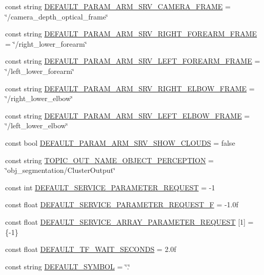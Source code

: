 \begin{DoxyCompactItemize}
\item 
const string \hyperlink{namespacesrvm_a9ae9e53a20ec9335fe07c1a42520198e}{D\-E\-F\-A\-U\-L\-T\-\_\-\-P\-A\-R\-A\-M\-\_\-\-A\-R\-M\-\_\-\-S\-R\-V\-\_\-\-C\-A\-M\-E\-R\-A\-\_\-\-F\-R\-A\-M\-E} = \char`\"{}/camera\-\_\-depth\-\_\-optical\-\_\-frame\char`\"{}
\item 
const string \hyperlink{namespacesrvm_a6e203b3aafd97558c58ada022c9cc514}{D\-E\-F\-A\-U\-L\-T\-\_\-\-P\-A\-R\-A\-M\-\_\-\-A\-R\-M\-\_\-\-S\-R\-V\-\_\-\-R\-I\-G\-H\-T\-\_\-\-F\-O\-R\-E\-A\-R\-M\-\_\-\-F\-R\-A\-M\-E} = \char`\"{}/right\-\_\-lower\-\_\-forearm\char`\"{}
\item 
const string \hyperlink{namespacesrvm_af63966bf248ec14ccf2a2ca74fa1214d}{D\-E\-F\-A\-U\-L\-T\-\_\-\-P\-A\-R\-A\-M\-\_\-\-A\-R\-M\-\_\-\-S\-R\-V\-\_\-\-L\-E\-F\-T\-\_\-\-F\-O\-R\-E\-A\-R\-M\-\_\-\-F\-R\-A\-M\-E} = \char`\"{}/left\-\_\-lower\-\_\-forearm\char`\"{}
\item 
const string \hyperlink{namespacesrvm_acb12c9f4a5661db79a05ea222c83e215}{D\-E\-F\-A\-U\-L\-T\-\_\-\-P\-A\-R\-A\-M\-\_\-\-A\-R\-M\-\_\-\-S\-R\-V\-\_\-\-R\-I\-G\-H\-T\-\_\-\-E\-L\-B\-O\-W\-\_\-\-F\-R\-A\-M\-E} = \char`\"{}/right\-\_\-lower\-\_\-elbow\char`\"{}
\item 
const string \hyperlink{namespacesrvm_ab8271bafa5b004c13196b24b77cef53a}{D\-E\-F\-A\-U\-L\-T\-\_\-\-P\-A\-R\-A\-M\-\_\-\-A\-R\-M\-\_\-\-S\-R\-V\-\_\-\-L\-E\-F\-T\-\_\-\-E\-L\-B\-O\-W\-\_\-\-F\-R\-A\-M\-E} = \char`\"{}/left\-\_\-lower\-\_\-elbow\char`\"{}
\item 
const bool \hyperlink{namespacesrvm_a7fdc748a5c9f8f7211d6e32e64f96c63}{D\-E\-F\-A\-U\-L\-T\-\_\-\-P\-A\-R\-A\-M\-\_\-\-A\-R\-M\-\_\-\-S\-R\-V\-\_\-\-S\-H\-O\-W\-\_\-\-C\-L\-O\-U\-D\-S} = false
\item 
const string \hyperlink{namespacesrvm_a520b8813dc65ba764d59f05a0b316e5c}{T\-O\-P\-I\-C\-\_\-\-O\-U\-T\-\_\-\-N\-A\-M\-E\-\_\-\-O\-B\-J\-E\-C\-T\-\_\-\-P\-E\-R\-C\-E\-P\-T\-I\-O\-N} = \char`\"{}obj\-\_\-segmentation/Cluster\-Output\char`\"{}
\item 
const int \hyperlink{namespacesrvm_a27b2693a98ba8791767e3c8bebdab105}{D\-E\-F\-A\-U\-L\-T\-\_\-\-S\-E\-R\-V\-I\-C\-E\-\_\-\-P\-A\-R\-A\-M\-E\-T\-E\-R\-\_\-\-R\-E\-Q\-U\-E\-S\-T} = -\/1
\item 
const float \hyperlink{namespacesrvm_a5a9ae08c1a139bbf76b39c5d34f90e2a}{D\-E\-F\-A\-U\-L\-T\-\_\-\-S\-E\-R\-V\-I\-C\-E\-\_\-\-P\-A\-R\-A\-M\-E\-T\-E\-R\-\_\-\-R\-E\-Q\-U\-E\-S\-T\-\_\-\-F} = -\/1.\-0f
\item 
const float \hyperlink{namespacesrvm_a07324815e3638c6740336e50699d3300}{D\-E\-F\-A\-U\-L\-T\-\_\-\-S\-E\-R\-V\-I\-C\-E\-\_\-\-A\-R\-R\-A\-Y\-\_\-\-P\-A\-R\-A\-M\-E\-T\-E\-R\-\_\-\-R\-E\-Q\-U\-E\-S\-T} \mbox{[}1\mbox{]} = \{-\/1\}
\item 
const float \hyperlink{namespacesrvm_a6debc60d19f8c5cfe2e7746da001f0d1}{D\-E\-F\-A\-U\-L\-T\-\_\-\-T\-F\-\_\-\-W\-A\-I\-T\-\_\-\-S\-E\-C\-O\-N\-D\-S} = 2.\-0f
\item 
const string \hyperlink{namespacesrvm_a01e5397d10883ed88b8d0abf1cfdd2ff}{D\-E\-F\-A\-U\-L\-T\-\_\-\-S\-Y\-M\-B\-O\-L} = \char`\"{}.\char`\"{}
\end{DoxyCompactItemize}


